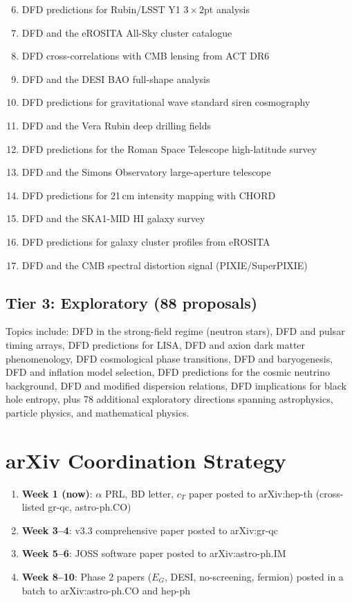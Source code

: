 \documentclass[11pt,a4paper]{article}
\begin{document}
\begin{enumerate}[nosep]
\setcounter{enumi}{5}
\item DFD predictions for Rubin/LSST Y1 $3\times 2$pt analysis
\item DFD and the eROSITA All-Sky cluster catalogue
\item DFD cross-correlations with CMB lensing from ACT DR6
\item DFD and the DESI BAO full-shape analysis
\item DFD predictions for gravitational wave standard siren cosmography
\item DFD and the Vera Rubin deep drilling fields
\item DFD predictions for the Roman Space Telescope high-latitude survey
\item DFD and the Simons Observatory large-aperture telescope
\item DFD predictions for 21\,cm intensity mapping with CHORD
\item DFD and the SKA1-MID HI galaxy survey
\item DFD predictions for galaxy cluster profiles from eROSITA
\item DFD and the CMB spectral distortion signal (PIXIE/SuperPIXIE)
\end{enumerate}

\subsection{Tier 3: Exploratory (88 proposals)}

Topics include: DFD in the strong-field regime (neutron stars), DFD and pulsar timing arrays, DFD predictions for LISA, DFD and axion dark matter phenomenology, DFD cosmological phase transitions, DFD and baryogenesis, DFD and inflation model selection, DFD predictions for the cosmic neutrino background, DFD and modified dispersion relations, DFD implications for black hole entropy, plus 78 additional exploratory directions spanning astrophysics, particle physics, and mathematical physics.

\section{arXiv Coordination Strategy}

\begin{tcolorbox}[colback=blue!5!white, colframe=dfdblue, title=\textbf{arXiv Posting Schedule}]
\begin{enumerate}[nosep]
\item \textbf{Week 1 (now)}: $\alpha$ PRL, BD letter, $c_T$ paper posted to arXiv:hep-th (cross-listed gr-qc, astro-ph.CO)
\item \textbf{Week 3--4}: v3.3 comprehensive paper posted to arXiv:gr-qc
\item \textbf{Week 5--6}: JOSS software paper posted to arXiv:astro-ph.IM
\item \textbf{Week 8--10}: Phase 2 papers ($E_G$, DESI, no-screening, fermion) posted in a batch to arXiv:astro-ph.CO and hep-ph
\end{enumerate}
\end{tcolorbox}
\end{document}
